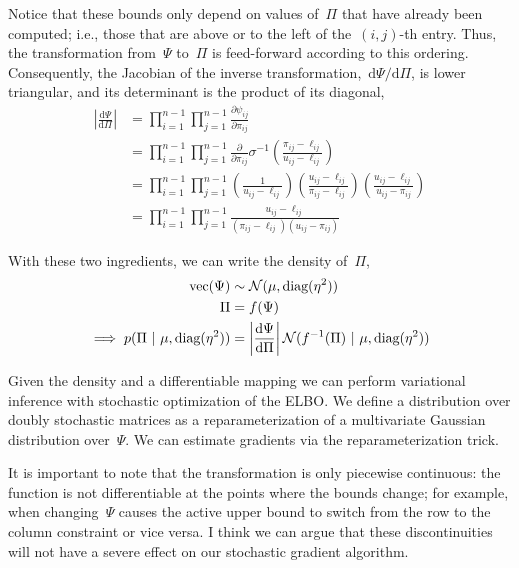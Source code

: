 \documentclass{article}
\begin{document}
Notice that these bounds only depend on values of~${\Pi}$ that
have already been computed; i.e., those that are above or to the left of
the~$(i,j)$-th entry. Thus, the transformation from~$\Psi$ to~${\Pi}$
is feed-forward according to this ordering.  Consequently, the
Jacobian of the inverse transformation,~$\mathrm{d}\Psi / \mathrm{d} \Pi$,
is lower triangular, and its determinant is the product of its diagonal,
\begin{align}
\left| \frac{\mathrm{d} \Psi } {\mathrm{d} \Pi} \right|
&= \prod_{i=1}^{n-1} \prod_{j=1}^{n-1} \frac{\partial \psi_{ij} }{\partial {\pi}_{ij}} \\
&= \prod_{i=1}^{n-1} \prod_{j=1}^{n-1} \frac{\partial}{\partial {\pi}_{ij}}
\sigma^{-1} \left( \frac{{\pi}_{ij} - \ell_{ij}}{u_{ij} - \ell_{ij}} \right ) \\
&= \prod_{i=1}^{n-1} \prod_{j=1}^{n-1}
\left( \frac{1}{u_{ij} - \ell_{ij}} \right )
\left( \frac{u_{ij} - \ell_{ij}}{{\pi}_{ij} - \ell_{ij}} \right )
\left( \frac{u_{ij} - \ell_{ij}}{u_{ij} - {\pi}_{ij}} \right ) \\
&= \prod_{i=1}^{n-1} \prod_{j=1}^{n-1}
\frac{u_{ij} - \ell_{ij}}{({\pi}_{ij} - \ell_{ij}) (u_{ij} - {\pi}_{ij})}
\end{align}

With these two ingredients, we can write the density of~${\Pi}$,
\begin{align}
  \text{vec} (\Psi) &\sim \mathcal{N}(\mu, \textrm{diag}(\eta^2))
  \\
  {\Pi} &= f(\Psi) \\
  \implies
  p(\Pi ~\vert~ \mu, \textrm{diag}(\eta^2)) &= \left|\frac{\mathrm{d} \Psi }{\mathrm{d} {\Pi}} \right|
  \mathcal{N}(f^{-1}({\Pi}) ~\vert~ \mu, \textrm{diag}(\eta^2))
\end{align}

Given the density and a differentiable mapping we can perform
variational inference with stochastic optimization of the ELBO.
We define a distribution over doubly stochastic matrices as a
reparameterization of a multivariate Gaussian distribution
over~$\Psi$. We can estimate gradients via the reparameterization
trick.

It is important to note that the transformation is only piecewise
continuous: the function is not differentiable at the points where
the bounds change; for example, when changing~$\Psi$ causes the
active upper bound to switch from the row to the column constraint
or vice versa.  I think we can argue that these discontinuities
will not have a severe effect on our stochastic gradient algorithm.
\end{document}
